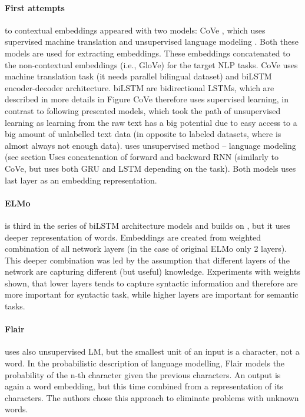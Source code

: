 \paragraph{First attempts} to contextual embeddings appeared with two models: CoVe \citep{McCann2017}, which uses supervised machine translation and unsupervised language modeling \citep{Peters2017}. Both these models are used for extracting embeddings. These embeddings concatenated to the non-contextual embeddings (i.e., GloVe) for the target NLP tasks. CoVe uses machine translation task (it needs parallel bilingual dataset) and biLSTM encoder-decoder architecture.  biLSTM are bidirectional LSTMs, which are described in more details in Figure  %
CoVe therefore uses supervised learning, in contrast to following presented models, which took the path of unsupervised learning as learning from the raw text has a big potential due to easy access to a big amount of unlabelled text data (in opposite to labeled datasets, where is almost always not enough data).
\citep{Peters2017} uses unsupervised method -- language modeling (see section %
Uses concatenation of forward and backward RNN (similarly to CoVe, but uses both GRU and LSTM depending on the task). Both models uses last layer as an embedding representation. 
\paragraph{ELMo} is third in the series of biLSTM architecture models and builds on \citep{Peters2017}, but it uses deeper representation of words. Embeddings are created from weighted combination of all network layers (in the case of original ELMo only 2 layers). This deeper combination was led by the assumption that different layers of the network are capturing different (but useful) knowledge. Experiments with weights shown, that lower layers tends to capture syntactic information and therefore are more important for syntactic task, while higher layers are important for semantic tasks. 
\paragraph{Flair} uses also unsupervised LM, but the smallest unit of an input is a character, not a word. In the probabilistic description of language modelling, Flair models the probability of the n-th character given the previous characters. An output is again a word embedding, but this time combined from a representation of its characters. The authors chose this approach to eliminate problems with unknown words.
